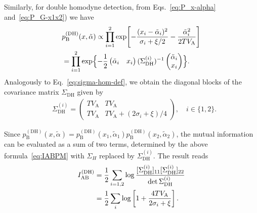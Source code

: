 \documentclass[%
reprint,
superscriptaddress,
 amsmath,amssymb,amsfonts,
 aps,
 pra,
 longbibliography
]{revtex4-2}
\newcommand{\ind}[1]{\mathrm{#1}}
\begin{document}
Similarly, for double homodyne detection,
from Eqs.~\eqref{eq:P_x-alpha} and~\eqref{eq:P_G-x1x2})
we have
\begin{align}
  \label{eq:dh-exp}
  &
  p_{\ind{B}}^{(\ind{DH})}(x,\tilde \alpha)
    \propto
\prod_{i=1}^2
    \exp\Biggl[
    -\frac{(x_i-\tilde\alpha_i)^2}{\sigma_i+\xi/2}-\frac{\tilde\alpha_i^2}{2TV_{\ind{A}}}
    \Biggr]
                                                \notag
  \\
  &
    =\prod_{i=1}^2
    \exp\Bigl\{
  -\frac{1}{2}
    \begin{pmatrix}
        \tilde\alpha_i&x_i
    \end{pmatrix} (\Sigma_{\ind{DH}}^{(i)})^{-1}
    \begin{pmatrix}
        \tilde\alpha_i\\x_i
    \end{pmatrix}
  \Bigr\}.
\end{align}
Analogously to Eq.~\eqref{eq:sigma-hom-def},
we obtain the diagonal blocks of the covariance matrix
$\Sigma_{\ind{DH}}$
given by
\begin{align}
  \label{eq:Sigma-DH}
  &
    \Sigma_{\ind{DH}}^{(i)}=
    \begin{pmatrix}
        {TV_{\ind{A}}}&{TV_{\ind{A}}}\\
        {TV_{\ind{A}}}&{TV_{\ind{A}}}+(2 \sigma_i+\xi)/4
    \end{pmatrix}, \quad i\in \{1,2\}.
\end{align}

Since
$p_{\ind{B}}^{(\ind{DH})}(x,\tilde\alpha)
=p_{\ind{B}}^{(\ind{DH})}(x_1,\tilde\alpha_1)p_{\ind{B}}^{(\ind{DH})}(x_2,\tilde\alpha_2)
$,
the mutual information can be evaluated as a sum of two terms,
determined by the above formula~\eqref{eq:IABPM}
with $\Sigma_H$ replaced by $\Sigma_{\ind{DH}}^{(i)}$.
The result reads
\begin{align}
  \label{eq:I_dh}
    I_{\ind{AB}}^{(\ind{DH})}&=\frac{1}{2}\sum_{i=1,2}\log \frac{[\Sigma_{\ind{DH}}^{(i)}]_{11}[\Sigma_{\ind{DH}}^{(i)}]_{22}}
    {\det\Sigma_{\ind{DH}}^{(i)}}\notag\\
    &=\frac{1}{2}\sum_i\log\left[1+\frac{4TV_{\ind{A}}}
    {2\sigma_i+\xi}\right].
\end{align}
\end{document}
